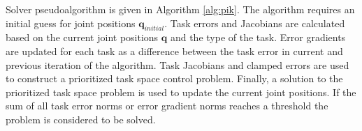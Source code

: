 Solver pseudoalgorithm is given in Algorithm \ref{alg:pik}. The algorithm requires an initial guess for joint positions $\boldsymbol{q}_{initial}$. Task errors and Jacobians are calculated based on the current joint positions $\boldsymbol{q}$ and the type of the task. Error gradients are updated for each task as a difference between the task error in current and previous iteration of the algorithm. Task Jacobians and clamped errors are used to construct a prioritized task space control problem. Finally, a solution to the prioritized task space problem is used to update the current joint positions. If the sum of all task error norms or error gradient norms reaches a threshold the problem is considered to be solved. 
\begin{comment}
\begin{algorithm}
\caption{Positional prioritized inverse kinematics solver.}\label{alg:pik}
$\boldsymbol{q} \gets \boldsymbol{q}_{initial}$\\
tasks $\gets [ ]$ \\
\While{$\sum \norm{ \boldsymbol{err_i}} \geq \varepsilon_{e}$ \textbf{and} $\sum \norm{ \nabla \boldsymbol{err_i}} \geq \varepsilon_\nabla$}
{
    \For{$i\gets0$ \KwTo N}{
    $\boldsymbol{J}_i$ \gets $getTaskJacobian(\boldsymbol{q}, tasktype_i)$\\
    $\boldsymbol{err}_i$ \gets $getTaskError(\boldsymbol{q}, tasktype_i)$\\
    $\nabla \boldsymbol{err}_i$ \gets $updateGradient(\boldsymbol{err}_i)$\\
    $\boldsymbol{err}_i$ \gets $clampTaskError(\boldsymbol{err}_i, $tasktype$_i)$\\
    tasks.insert($\boldsymbol{J}_i, \boldsymbol{err}_i$)\\
    }
    $\boldsymbol{q}$ \gets $solvePTSC(tasks, constraints)$\\
    tasks.clear$()$ \\
}

\end{algorithm}
\end{comment}

